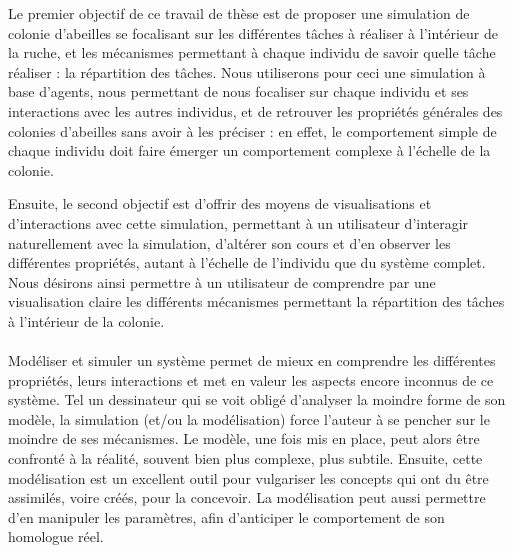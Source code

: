 	Le premier objectif de ce travail de thèse est de proposer une simulation de colonie d'abeilles se focalisant sur les différentes tâches à réaliser à l'intérieur de la ruche, et les mécanismes permettant à chaque individu de savoir quelle tâche réaliser : la répartition des tâches. Nous utiliserons pour ceci une simulation à base d'agents, nous permettant de nous focaliser sur chaque individu et ses interactions avec les autres individus, et de retrouver les propriétés générales des colonies d'abeilles sans avoir à les préciser : en effet, le comportement simple de chaque individu doit faire émerger un comportement complexe à l'échelle de la colonie. 
	
	Ensuite, le second objectif est d'offrir des moyens de visualisations et d'interactions avec cette simulation, permettant à un utilisateur d'interagir naturellement avec la simulation, d'altérer son cours et d'en observer les différentes propriétés, autant à l'échelle de l'individu que du système complet. Nous désirons ainsi permettre à un utilisateur de comprendre par une visualisation claire les différents mécanismes permettant la répartition des tâches à l'intérieur de la colonie.
	
	\paragraph{}		
		Modéliser et simuler un système permet de mieux en comprendre les différentes propriétés, leurs interactions et met en valeur les aspects encore inconnus de ce système. Tel un dessinateur qui se voit obligé d'analyser la moindre forme de son modèle, la simulation (et/ou la modélisation) force l'auteur à se pencher sur le moindre de ses mécanismes. Le modèle, une fois mis en place, peut alors être confronté à la réalité, souvent bien plus complexe, plus subtile. Ensuite, cette modélisation est un excellent outil pour vulgariser les concepts qui ont du être assimilés, voire créés, pour la concevoir. La modélisation peut aussi permettre d'en manipuler les paramètres, afin d'anticiper le comportement de son homologue réel.
		
	
